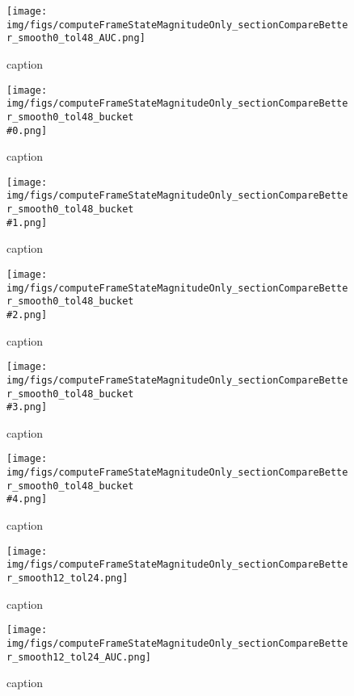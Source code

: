 %
\begin{figure}[!ht]
	\centering
	\texttt{[image: img/figs/computeFrameStateMagnitudeOnly\_sectionCompareBetter\_smooth0\_tol48\_AUC.png]}
	\caption{caption}
	\label{fig:computeFrameStateMagnitudeOnly_sectionCompareBetter_smooth0_tol48_AUC.png}
\end{figure}
%
\begin{figure}[!ht]
	\centering
	\texttt{[image: img/figs/computeFrameStateMagnitudeOnly\_sectionCompareBetter\_smooth0\_tol48\_bucket\\\#0.png]}
	\caption{caption}
	\label{fig:computeFrameStateMagnitudeOnly_sectionCompareBetter_smooth0_tol48_bucket\#0.png}
\end{figure}
%
\begin{figure}[!ht]
	\centering
	\texttt{[image: img/figs/computeFrameStateMagnitudeOnly\_sectionCompareBetter\_smooth0\_tol48\_bucket\\\#1.png]}
	\caption{caption}
	\label{fig:computeFrameStateMagnitudeOnly_sectionCompareBetter_smooth0_tol48_bucket\#1.png}
\end{figure}
%
\begin{figure}[!ht]
	\centering
	\texttt{[image: img/figs/computeFrameStateMagnitudeOnly\_sectionCompareBetter\_smooth0\_tol48\_bucket\\\#2.png]}
	\caption{caption}
	\label{fig:computeFrameStateMagnitudeOnly_sectionCompareBetter_smooth0_tol48_bucket\#2.png}
\end{figure}
%
\begin{figure}[!ht]
	\centering
	\texttt{[image: img/figs/computeFrameStateMagnitudeOnly\_sectionCompareBetter\_smooth0\_tol48\_bucket\\\#3.png]}
	\caption{caption}
	\label{fig:computeFrameStateMagnitudeOnly_sectionCompareBetter_smooth0_tol48_bucket\#3.png}
\end{figure}
%
\begin{figure}[!ht]
	\centering
	\texttt{[image: img/figs/computeFrameStateMagnitudeOnly\_sectionCompareBetter\_smooth0\_tol48\_bucket\\\#4.png]}
	\caption{caption}
	\label{fig:computeFrameStateMagnitudeOnly_sectionCompareBetter_smooth0_tol48_bucket\#4.png}
\end{figure}
%
\begin{figure}[!ht]
	\centering
	\texttt{[image: img/figs/computeFrameStateMagnitudeOnly\_sectionCompareBetter\_smooth12\_tol24.png]}
	\caption{caption}
	\label{fig:computeFrameStateMagnitudeOnly_sectionCompareBetter_smooth12_tol24.png}
\end{figure}
%
\begin{figure}[!ht]
	\centering
	\texttt{[image: img/figs/computeFrameStateMagnitudeOnly\_sectionCompareBetter\_smooth12\_tol24\_AUC.png]}
	\caption{caption}
	\label{fig:computeFrameStateMagnitudeOnly_sectionCompareBetter_smooth12_tol24_AUC.png}
\end{figure}
